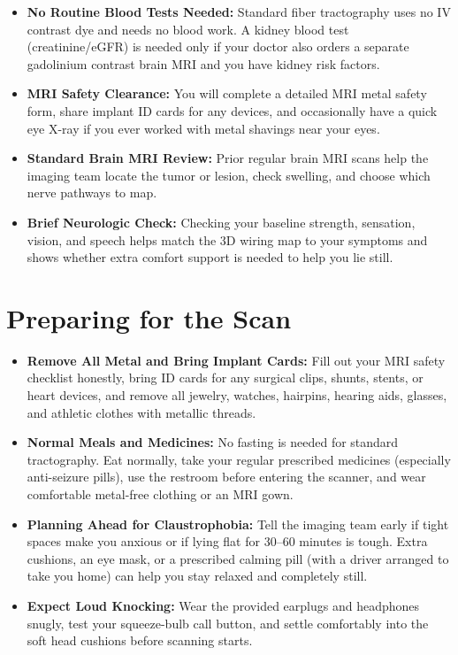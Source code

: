 \begin{itemize}
    \item \textbf{No Routine Blood Tests Needed:} Standard fiber tractography uses no IV contrast dye and needs no blood work. A kidney blood test (creatinine/eGFR) is needed only if your doctor also orders a separate gadolinium contrast brain MRI and you have kidney risk factors.
    \item \textbf{MRI Safety Clearance:} You will complete a detailed MRI metal safety form, share implant ID cards for any devices, and occasionally have a quick eye X-ray if you ever worked with metal shavings near your eyes.
    \item \textbf{Standard Brain MRI Review:} Prior regular brain MRI scans help the imaging team locate the tumor or lesion, check swelling, and choose which nerve pathways to map.
    \item \textbf{Brief Neurologic Check:} Checking your baseline strength, sensation, vision, and speech helps match the 3D wiring map to your symptoms and shows whether extra comfort support is needed to help you lie still.
\end{itemize}

\section{Preparing for the Scan}

\begin{itemize}
    \item \textbf{Remove All Metal and Bring Implant Cards:} Fill out your MRI safety checklist honestly, bring ID cards for any surgical clips, shunts, stents, or heart devices, and remove all jewelry, watches, hairpins, hearing aids, glasses, and athletic clothes with metallic threads.
    \item \textbf{Normal Meals and Medicines:} No fasting is needed for standard tractography. Eat normally, take your regular prescribed medicines (especially anti-seizure pills), use the restroom before entering the scanner, and wear comfortable metal-free clothing or an MRI gown.
    \item \textbf{Planning Ahead for Claustrophobia:} Tell the imaging team early if tight spaces make you anxious or if lying flat for 30--60 minutes is tough. Extra cushions, an eye mask, or a prescribed calming pill (with a driver arranged to take you home) can help you stay relaxed and completely still.
    \item \textbf{Expect Loud Knocking:} Wear the provided earplugs and headphones snugly, test your squeeze-bulb call button, and settle comfortably into the soft head cushions before scanning starts.
\end{itemize}

